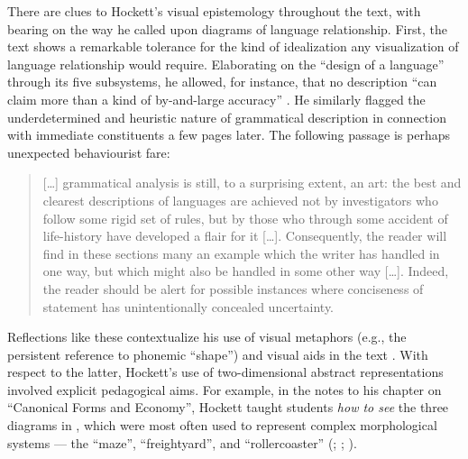 \documentclass[output=paper]{langscibook}
\begin{document}
There are clues to Hockett's visual epistemology throughout the text, with bearing on the way he called upon diagrams of language relationship. First, the text shows a remarkable tolerance for the kind of idealization any visualization of language relationship would require. Elaborating on the ``design of a language'' through its five subsystems, he allowed, for instance, that no description ``can claim more than a kind of by-and-large accuracy'' \citep[139]{Hockett19591958}. He similarly flagged the underdetermined and heuristic nature of grammatical description in connection with immediate constituents a few pages later. The following passage is perhaps unexpected behaviourist fare:

\begin{quotation}
[…] grammatical analysis is still, to a surprising extent, an art: the best and clearest descriptions of languages are achieved not by investigators who follow some rigid set of rules, but by those who through some accident of life-history have developed a flair for it […]. Consequently, the reader will find in these sections many an example which the writer has handled in one way, but which might also be handled in some other way […]. Indeed, the reader should be alert for possible instances where conciseness of statement has unintentionally concealed uncertainty.  \citep[147]{Hockett19591958}\label{kaplan:hockettquote}
\end{quotation}

Reflections like these contextualize his use of visual metaphors (e.g., the persistent reference to phonemic ``shape'') and visual aids in the text \citep[130--132]{Hockett19591958}. With respect to the latter, Hockett's use of two-dimensional abstract representations involved explicit pedagogical aims. For example, in the notes to his chapter on ``Canonical Forms and Economy'', Hockett taught students \emph{how to see} the three diagrams in , which were most often used to represent complex morphological systems — the ``maze'', ``freightyard'', and ``rollercoaster'' (\citealt[290--292]{Hockett19591958}; \citealt{Harris1951}; \citealt{Hoenigswald1950}).
\end{document}
